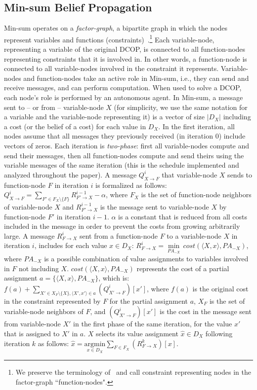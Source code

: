 \subsection{Min-sum Belief Propagation}
\label{secmaxsum}
Min-sum operates on a \emph{factor-graph}, a bipartite graph in which the nodes represent variables and functions (constraints)~\cite{KschischangFL01}.\footnote{We preserve the terminology of~\cite{FarinelliRPJ08} and call constraint representing nodes in the factor-graph ``function-nodes".}
Each variable-node, representing a variable of the original DCOP, is connected to all function-nodes representing constraints that it is involved in. In other words, a function-node is connected to all variable-nodes involved in the constraint it represents.
Variable-nodes and function-nodes take an active role in Min-sum, i.e., they can send and receive messages, and can perform computation. When used to solve a DCOP, each node's role is performed by an autonomous agent.
In Min-sum, a message sent to -- or from -- variable-node $X$ (for simplicity, we use the same notation for a variable and the variable-node representing it) is a vector of size $|D_X|$ including a cost (or the belief of a cost) for each value in $D_X$.
In the first iteration, all nodes assume that all messages they previously received (in iteration $0$) include vectors of zeros. Each iteration is \emph{two-phase}: first all variable-nodes compute and send their messages, then all function-nodes compute and send theirs using the variable messages of the same iteration (this is the schedule implemented and analyzed throughout the paper). A message $Q_{X \rightarrow F}^i$ that variable-node $X$ sends to function-node $F$ in iteration $i$ is formalized as follows:
$Q_{X \rightarrow F}^i =\underset{F'\in F_X \setminus \{ F\} }{ \sum} R_{F' \rightarrow X}^{i-1} - \alpha$,
where $F_X$ is the set of function-node neighbors of variable-node $X$ and $R_{F' \rightarrow X}^{i-1}$ is the message sent to variable-node $X$ by function-node $F'$ in iteration $i-1$.
$\alpha$ is a constant that is reduced from all costs included in the message in order to prevent the costs from growing arbitrarily large.
A message $R_{F \rightarrow X}^{i}$ sent from a function-node $F$ to a variable-node $X$ in iteration $i$,
includes for each value $x \in D_X$:
$R_{F \rightarrow X}^{i} = \underset{{PA_{-X}}} \min\, cost (\langle X , x \rangle, PA_{-X})$,
where $PA_{-X}$ is a possible combination of value assignments to variables involved in $F$ not including $X$. $cost(\langle X , x \rangle, PA_{-X})$ represents the cost of a partial assignment $a = \{ \langle X, x \rangle, PA_{-X} \}$, which is:
$f(a) + \underset{X' \in X_F \setminus \{X\},\langle X',x' \rangle \in a}{\sum} (Q_{X' \rightarrow F}^{i})[x']$,
where $f(a)$ is the original cost in the constraint represented by $F$ for the partial assignment $a$, $X_F$ is the set of variable-node neighbors of $F$, and $(Q_{X' \rightarrow F}^{i})[x']$ is the cost in the message sent from variable-node $X'$ in the first phase of the same iteration, for the value $x'$ that is assigned to $X'$ in $a$.
$X$ selects its value assignment $\hat{x} \in D_X$ following iteration $k$ as follows:
$\hat{x} = \underset{x\in D_X}{\mathrm{argmin}} \sum_{F\in F_X} (R_{F \rightarrow X}^k)[x]$.
